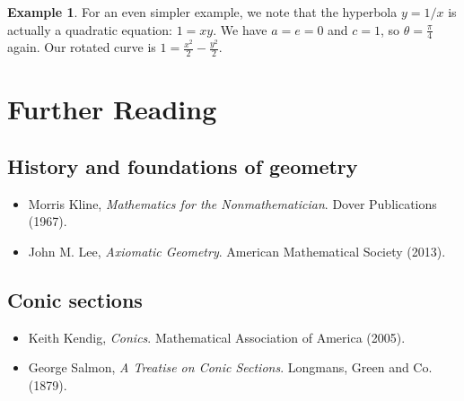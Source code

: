 \documentclass[a4paper,leqno]{article}
\numberwithin{equation}{section}
\theoremstyle{definition}
\newtheorem{ex}[equation]{Example}
\theoremstyle{remark}
\begin{document}
\begin{ex}
  For an even simpler example, we note that the hyperbola $ y = 1/x $ is actually a quadratic equation: $ 1 = xy $. We
  have $ a = e = 0 $ and $ c = 1 $, so $ \theta = \frac{\pi}{4} $ again. Our rotated curve is $ 1 = \frac{x^2}{2} - \frac{y^2}{2} $.
\end{ex}

\section{Further Reading}
\subsection*{History and foundations of geometry}
\begin{itemize}
  \item Morris Kline, \emph{Mathematics for the Nonmathematician}. Dover Publications (1967).
  \item John M. Lee, \emph{Axiomatic Geometry}. American Mathematical Society (2013).
\end{itemize}

\subsection*{Conic sections}
\begin{itemize}
  \item Keith Kendig, \emph{Conics}. Mathematical Association of America (2005).
  \item George Salmon, \emph{A Treatise on Conic Sections}. Longmans, Green and Co. (1879).
\end{itemize}
\end{document}
